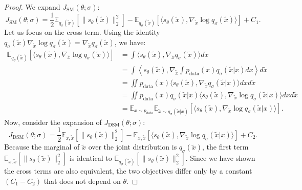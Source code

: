 \begin{proof}
We expand $J_{\text{SM}}(\theta; \sigma)$:
\begin{equation}
    J_{\text{SM}}(\theta; \sigma) = \frac{1}{2} \mathbb{E}_{q_\sigma(\tilde{x})} [\|s_\theta(\tilde{x})\|_2^2] - \mathbb{E}_{q_\sigma(\tilde{x})} [\langle s_\theta(\tilde{x}), \nabla_{\tilde{x}} \log q_\sigma(\tilde{x}) \rangle] + C_1.
\end{equation}
Let us focus on the cross term. Using the identity $q_\sigma(\tilde{x}) \nabla_{\tilde{x}} \log q_\sigma(\tilde{x}) = \nabla_{\tilde{x}} q_\sigma(\tilde{x})$, we have:
\begin{align*}
    \mathbb{E}_{q_\sigma(\tilde{x})} [\langle s_\theta(\tilde{x}), \nabla_{\tilde{x}} \log q_\sigma(\tilde{x}) \rangle] &= \int \langle s_\theta(\tilde{x}), \nabla_{\tilde{x}} q_\sigma(\tilde{x}) \rangle d\tilde{x} \\
    &= \int \left\langle s_\theta(\tilde{x}), \nabla_{\tilde{x}} \int p_{\text{data}}(x) q_\sigma(\tilde{x}|x) dx \right\rangle d\tilde{x} \\
    &= \iint p_{\text{data}}(x) \langle s_\theta(\tilde{x}), \nabla_{\tilde{x}} q_\sigma(\tilde{x}|x) \rangle dx d\tilde{x} \\
    &= \iint p_{\text{data}}(x) q_\sigma(\tilde{x}|x) \langle s_\theta(\tilde{x}), \nabla_{\tilde{x}} \log q_\sigma(\tilde{x}|x) \rangle dx d\tilde{x} \\
    &= \mathbb{E}_{x \sim p_{\text{data}}} \mathbb{E}_{\tilde{x} \sim q_\sigma(\tilde{x}|x)} [\langle s_\theta(\tilde{x}), \nabla_{\tilde{x}} \log q_\sigma(\tilde{x}|x) \rangle].
\end{align*}
Now, consider the expansion of $J_{\text{DSM}}(\theta; \sigma)$:
\begin{equation}
    J_{\text{DSM}}(\theta; \sigma) = \frac{1}{2} \mathbb{E}_{x, \tilde{x}} [\|s_\theta(\tilde{x})\|_2^2] - \mathbb{E}_{x, \tilde{x}} [\langle s_\theta(\tilde{x}), \nabla_{\tilde{x}} \log q_\sigma(\tilde{x}|x) \rangle] + C_2.
\end{equation}
Because the marginal of $\tilde{x}$ over the joint distribution is $q_\sigma(\tilde{x})$, the first term $\mathbb{E}_{x, \tilde{x}} [\|s_\theta(\tilde{x})\|_2^2]$ is identical to $\mathbb{E}_{q_\sigma(\tilde{x})} [\|s_\theta(\tilde{x})\|_2^2]$. Since we have shown the cross terms are also equivalent, the two objectives differ only by a constant $(C_1 - C_2)$ that does not depend on $\theta$.
\end{proof}

